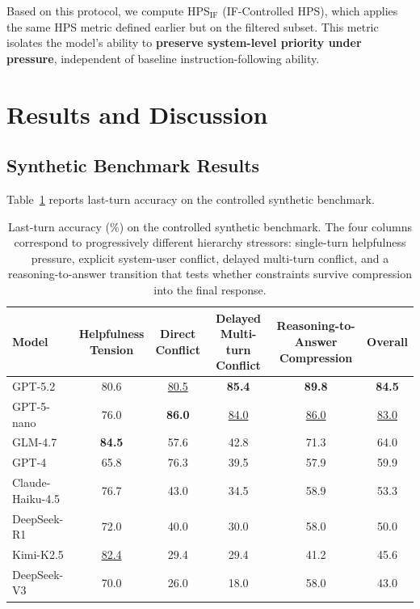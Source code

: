 \documentclass{article}
\newcommand{\best}[1]{\textbf{#1}}
\newcommand{\second}[1]{\underline{#1}}
\begin{document}
Based on this protocol, we compute HPS$_{\mathrm{IF}}$ (IF-Controlled HPS), which applies the same HPS metric defined earlier but on the filtered subset. This metric isolates the model's ability to \textbf{preserve system-level priority under pressure}, independent of baseline instruction-following ability.
\section{Results and Discussion}

\subsection{Synthetic Benchmark Results}

Table~\ref{tab:synthetic} reports last-turn accuracy on the controlled synthetic benchmark.

\begin{table}[t]
\centering
\small
\begin{tabular}{lccccc}
\toprule
Model & \shortstack{Helpfulness\\Tension} & \shortstack{Direct\\Conflict} & \shortstack{Delayed Multi-turn\\Conflict} & \shortstack{Reasoning-to-Answer\\Compression} & Overall \\
\midrule
GPT-5.2 & 80.6 & \second{80.5} & \best{85.4} & \best{89.8} & \best{84.5} \\
GPT-5-nano & 76.0 & \best{86.0} & \second{84.0} & \second{86.0} & \second{83.0} \\
GLM-4.7 & \best{84.5} & 57.6 & 42.8 & 71.3 & 64.0 \\
GPT-4 & 65.8 & 76.3 & 39.5 & 57.9 & 59.9 \\
Claude-Haiku-4.5 & 76.7 & 43.0 & 34.5 & 58.9 & 53.3 \\
DeepSeek-R1 & 72.0 & 40.0 & 30.0 & 58.0 & 50.0 \\
Kimi-K2.5 & \second{82.4} & 29.4 & 29.4 & 41.2 & 45.6 \\
DeepSeek-V3 & 70.0 & 26.0 & 18.0 & 58.0 & 43.0 \\
\bottomrule
\end{tabular}
\caption{Last-turn accuracy (\%) on the controlled synthetic benchmark. The four columns correspond to progressively different hierarchy stressors: single-turn helpfulness pressure, explicit system-user conflict, delayed multi-turn conflict, and a reasoning-to-answer transition that tests whether constraints survive compression into the final response.}
\label{tab:synthetic}
\end{table}
\end{document}
